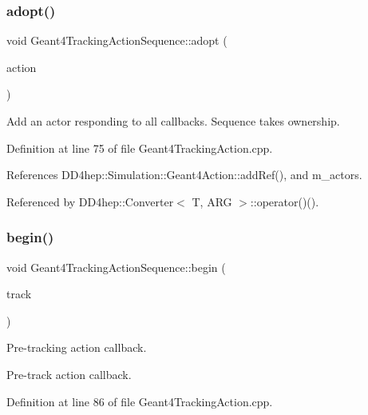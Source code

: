 \subsubsection{\texorpdfstring{adopt()}{adopt()}}
{\footnotesize\ttfamily void Geant4\+Tracking\+Action\+Sequence\+::adopt (\begin{DoxyParamCaption}\item[{\hyperlink{class_d_d4hep_1_1_simulation_1_1_geant4_tracking_action}{Geant4\+Tracking\+Action} $\ast$}]{action }\end{DoxyParamCaption})}



Add an actor responding to all callbacks. Sequence takes ownership. 



Definition at line 75 of file Geant4\+Tracking\+Action.\+cpp.



References D\+D4hep\+::\+Simulation\+::\+Geant4\+Action\+::add\+Ref(), and m\+\_\+actors.



Referenced by D\+D4hep\+::\+Converter$<$ T, A\+R\+G $>$\+::operator()().

\hypertarget{class_d_d4hep_1_1_simulation_1_1_geant4_tracking_action_sequence_a21df8be5f0514bb4295fc2de9afe4eb2}{}\label{class_d_d4hep_1_1_simulation_1_1_geant4_tracking_action_sequence_a21df8be5f0514bb4295fc2de9afe4eb2} 
\subsubsection{\texorpdfstring{begin()}{begin()}}
{\footnotesize\ttfamily void Geant4\+Tracking\+Action\+Sequence\+::begin (\begin{DoxyParamCaption}\item[{const G4\+Track $\ast$}]{track }\end{DoxyParamCaption})\hspace{0.3cm}{\ttfamily [virtual]}}



Pre-\/tracking action callback. 

Pre-\/track action callback. 

Definition at line 86 of file Geant4\+Tracking\+Action.\+cpp.



